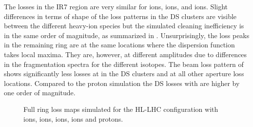 The losses in the IR7 region are very similar for \lead ions,  ions, and  ions. Slight differences in terms of shape of the loss patterns in the DS clusters are visible between the different heavy-ion species but the simulated cleaning inefficiency is in the same order of magnitude, as summarized in . Unsurprisingly, the loss peaks in the remaining ring are at the same locations where the dispersion function takes local maxima. They are, however, at different amplitudes due to differences in the fragmentation spectra for the different isotopes. The beam loss pattern of  shows significantly less losses at in the DS clusters and at all other aperture loss locations. Compared to the proton simulation the DS losses with  are higher by one order of magnitude.



\begin{figure}[t]
  \centering
  \caption{Full ring loss maps simulated for the HL-LHC configuration with \lead ions,  ions,  ions,  ions and protons.}  
  \label{pic:16072602}
  \end{figure}


